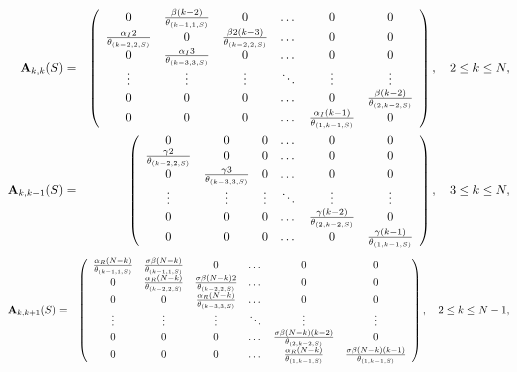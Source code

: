 \documentclass[preprint,12pt]{elsarticle}
\begin{document}
{\scriptsize
\begin{eqnarray*}
 {\bf A}_{k,k}(S) &=& \left(\begin{array}{cccccc}
0 & \frac{\beta(k-2)}{\theta_{(k-1,1,S)}} & 0 & \dots & 0 & 0\\
\frac{\alpha_I2}{\theta_{(k-2,2,S)}} & 0 & \frac{\beta2(k-3)}{\theta_{(k-2,2,S)}} & \dots & 0 & 0\\
0 & \frac{\alpha_I3}{\theta_{(k-3,3,S)}} & 0 & \dots & 0 & 0\\
\vdots & \vdots & \vdots & \ddots & \vdots & \vdots\\
0 & 0 & 0 & \dots & 0 & \frac{\beta(k-2)}{\theta_{(2,k-2,S)}}\\
0 & 0 & 0 & \dots & \frac{\alpha_I(k-1)}{\theta_{(1,k-1,S)}} & 0
                        \end{array}\right),\quad 2\leq k\leq N,\\
 {\bf A}_{k,k-1}(S) &=& \left(\begin{array}{cccccc}
0 & 0 & 0 & \dots & 0 & 0\\
\frac{\gamma2}{\theta_{(k-2,2,S)}} & 0 & 0 & \dots & 0 & 0\\
0 & \frac{\gamma3}{\theta_{(k-3,3,S)}} & 0 & \dots & 0 & 0\\
\vdots & \vdots & \vdots & \ddots & \vdots & \vdots\\
0 & 0 & 0 & \dots & \frac{\gamma(k-2)}{\theta_{(2,k-2,S)}} & 0\\
0 & 0 & 0 & \dots & 0 & \frac{\gamma(k-1)}{\theta_{(1,k-1,S)}}
                        \end{array}\right),\quad 3\leq k\leq N,
\end{eqnarray*}
\begin{eqnarray*}
 {\bf A}_{k,k+1}(S) &=& \left(\begin{array}{cccccc}
\frac{\alpha_R(N-k)}{\theta_{(k-1,1,S)}} & \frac{\sigma\beta(N-k)}{\theta_{(k-1,1,S)}} & 0 & \dots & 0 & 0\\
0 & \frac{\alpha_R(N-k)}{\theta_{(k-2,2,S)}} & \frac{\sigma\beta(N-k)2}{\theta_{(k-2,2,S)}} & \dots & 0 & 0\\
0 & 0 & \frac{\alpha_R(N-k)}{\theta_{(k-3,3,S)}} & \dots & 0 & 0\\
\vdots & \vdots & \vdots & \ddots & \vdots & \vdots\\
0 & 0 & 0 & \dots & \frac{\sigma\beta(N-k)(k-2)}{\theta_{(2,k-2,S)}} & 0\\
0 & 0 & 0 & \dots & \frac{\alpha_R(N-k)}{\theta_{(1,k-1,S)}} & \frac{\sigma\beta(N-k)(k-1)}{\theta_{(1,k-1,S)}}
                        \end{array}\right),\quad 2\leq k\leq N-1,
\end{eqnarray*}}
\end{document}
